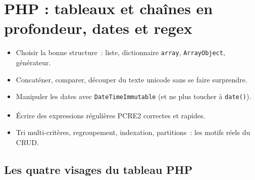 \documentclass[12pt,a4paper,twoside,openright]{book}
\begin{document}
\chapter{PHP : tableaux et cha\^ines en profondeur, dates et regex}
\label{ch-php-struct}

\begin{objectif}
\begin{itemize}
  \item Choisir la bonne structure~: liste, dictionnaire \verb|array|, \verb|ArrayObject|, g\'en\'erateur.
  \item Concat\'ener, comparer, d\'ecouper du texte unicode sans se faire surprendre.
  \item Manipuler les dates avec \verb|DateTimeImmutable| (et ne plus toucher \`a \verb|date()|).
  \item \'Ecrire des expressions r\'eguli\`eres PCRE\textsuperscript{}{2} correctes et rapides.
  \item Tri multi-crit\`eres, regroupement, indexation, partitions~: les motifs r\'eels du CRUD.
\end{itemize}
\end{objectif}

\section{Les quatre visages du tableau PHP}
\end{document}
